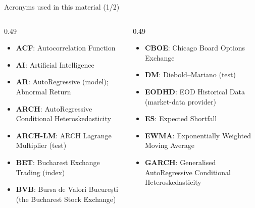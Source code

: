 \providecommand{\sfmapplink}[3]{\hypertarget{#2}{}\hyperlink{#1}{\beamergotobutton{#3}}}  %
\providecommand{\sfmappback}[2]{\begin{tikzpicture}[remember picture,overlay]\node[anchor=south east] at ([xshift=-3mm,yshift=7mm]current page.south east){\hyperlink{#1}{\beamerreturnbutton{#2}}};\end{tikzpicture}}  %
\providecommand{\sfmchlink}[2]{\href{#1}{#2}}  %
\providecommand{\sfmchlinkt}[2]{\href{#1}{\usebeamercolor[fg]{frametitle}#2}}  %


{
\begin{frame}[noframenumbering]
    \titlepage
\end{frame}
}
\begin{frame}{Acronyms used in this material (1/2)}
\begin{columns}[T]
\begin{column}{0.49\textwidth}
\begin{itemize}\setlength{\itemsep}{0pt}
    \item \textbf{ACF}: Autocorrelation Function
    \item \textbf{AI}: Artificial Intelligence
    \item \textbf{AR}: AutoRegressive (model); Abnormal Return
    \item \textbf{ARCH}: AutoRegressive Conditional Heteroskedasticity
    \item \textbf{ARCH-LM}: ARCH Lagrange Multiplier (test)
    \item \textbf{BET}: Bucharest Exchange Trading (index)
    \item \textbf{BVB}: Bursa de Valori București (the Bucharest Stock Exchange)
\end{itemize}
\end{column}
\begin{column}{0.49\textwidth}
\begin{itemize}\setlength{\itemsep}{0pt}
    \item \textbf{CBOE}: Chicago Board Options Exchange
    \item \textbf{DM}: Diebold–Mariano (test)
    \item \textbf{EODHD}: EOD Historical Data (market-data provider)
    \item \textbf{ES}: Expected Shortfall
    \item \textbf{EWMA}: Exponentially Weighted Moving Average
    \item \textbf{GARCH}: Generalised AutoRegressive Conditional Heteroskedasticity
\end{itemize}
\end{column}
\end{columns}
\end{frame}
